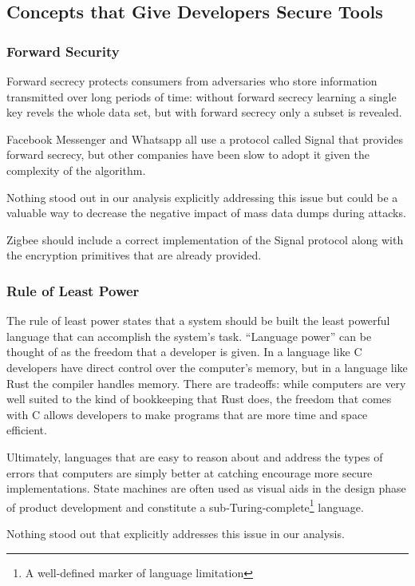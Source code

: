 \subsection{Concepts that Give Developers Secure Tools}
\subsubsection{Forward Security}
Forward secrecy protects consumers from adversaries who store information transmitted over long periods of time: without forward secrecy learning a single key revels the whole data set, but with forward secrecy only a subset is revealed. 


 Facebook Messenger and Whatsapp all use a protocol called Signal that provides forward secrecy, but other companies have been slow to adopt it given the complexity of the algorithm. 


 Nothing stood out in our analysis explicitly addressing this issue but could be a valuable way to decrease the negative impact of mass data dumps during attacks.


 Zigbee should include a correct implementation of the Signal protocol along with the encryption primitives that are already provided.

\subsubsection{Rule of Least Power}
The rule of least power states that a system should be built the least powerful language that can accomplish the system’s task. “Language power” can be thought of as the freedom that a developer is given. In a language like C developers have direct control over the computer’s memory, but in a language like Rust the compiler handles memory. There are tradeoffs: while computers are very well suited to the kind of bookkeeping that Rust does, the freedom that comes with C allows developers to make programs that are more time and space efficient.


 Ultimately, languages that are easy to reason about and address the types of errors that computers are simply better at catching encourage more secure implementations. State machines are often used as visual aids in the design phase of product development and constitute a sub-Turing-complete\footnote{A well-defined marker of language limitation} language.

 Nothing stood out that explicitly addresses this issue in our analysis.


